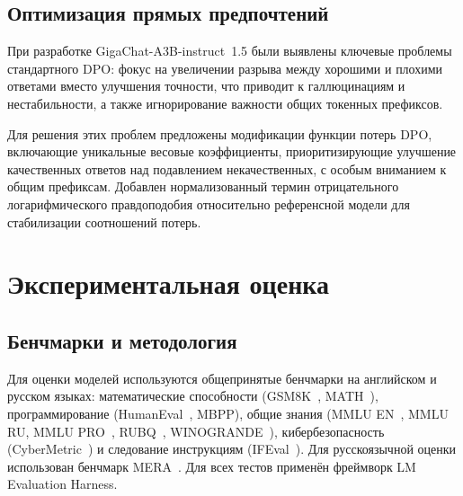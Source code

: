 \begin{table}[H]
    \centering
    \caption{Гиперпараметры дообучения моделей GigaChat.}
    \label{tab:gc_sft_hp}
\end{table}

\subsection{Оптимизация прямых предпочтений}\label{subsec:gc_dpo}

При разработке GigaChat-A3B-instruct~1.5 были выявлены ключевые проблемы стандартного DPO: фокус на увеличении разрыва между хорошими и плохими ответами вместо улучшения точности, что приводит к галлюцинациям и нестабильности, а также игнорирование важности общих токенных префиксов.

Для решения этих проблем предложены модификации функции потерь DPO, включающие уникальные весовые коэффициенты, приоритизирующие улучшение качественных ответов над подавлением некачественных, с особым вниманием к общим префиксам. Добавлен нормализованный термин отрицательного логарифмического правдоподобия относительно референсной модели для стабилизации соотношений потерь.

\section{Экспериментальная оценка}\label{sec:gc_evaluation}

\subsection{Бенчмарки и методология}\label{subsec:gc_benchmarks}

Для оценки моделей используются общепринятые бенчмарки на английском и русском языках: математические способности (GSM8K~\cite{cobbe2021gsm8k}, MATH~\cite{hendrycks2021math}), программирование (HumanEval~\cite{chen2021humaneval}, MBPP), общие знания (MMLU EN~\cite{hendrycks2020mmlu}, MMLU RU, MMLU PRO~\cite{wang2024mmlupro}, RUBQ~\cite{korablinov2020rubq}, WINOGRANDE~\cite{sakaguchi2021winogrande}), кибербезопасность (CyberMetric~\cite{tihanyi2024cybermetric}) и следование инструкциям (IFEval~\cite{zhou2023ifeval}). Для русскоязычной оценки использован бенчмарк MERA~\cite{fenogenova2024mera}. Для всех тестов применён фреймворк LM Evaluation Harness.

